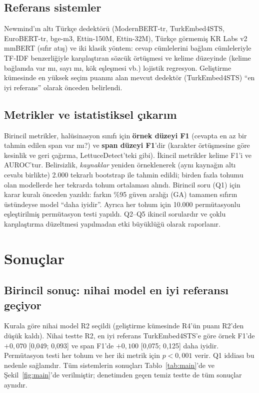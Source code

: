\documentclass[conference,a4paper]{IEEEtran}
\begin{document}
\subsection{Referans sistemler}
Newmind'ın altı Türkçe dedektörü (ModernBERT-tr, TurkEmbed4STS, EuroBERT-tr, bge-m3, Ettin-150M, Ettin-32M), Türkçe görmemiş KR Labs v2 mmBERT (sıfır atış) ve iki klasik yöntem: cevap cümlelerini bağlam cümleleriyle TF-IDF benzerliğiyle karşılaştıran sözcük örtüşmesi ve kelime düzeyinde (kelime bağlamda var mı, sayı mı, kök eşleşmesi vb.) lojistik regresyon. Geliştirme kümesinde en yüksek seçim puanını alan mevcut dedektör (TurkEmbed4STS) ``en iyi referans'' olarak önceden belirlendi.

\subsection{Metrikler ve istatistiksel çıkarım}
Birincil metrikler, halüsinasyon sınıfı için \textbf{örnek düzeyi F1} (cevapta en az bir tahmin edilen span var mı?) ve \textbf{span düzeyi F1}'dir (karakter örtüşmesine göre kesinlik ve geri çağırma, LettuceDetect'teki gibi). İkincil metrikler kelime F1'i ve AUROC'tur. Belirsizlik, \emph{kaynaklar} yeniden örneklenerek (aynı kaynağın altı cevabı birlikte) 2.000 tekrarlı bootstrap ile tahmin edildi; birden fazla tohumu olan modellerde her tekrarda tohum ortalaması alındı. Birincil soru (Q1) için karar kuralı önceden yazıldı: farkın \%95 güven aralığı (GA) tamamen sıfırın üstündeyse model ``daha iyidir''. Ayrıca her tohum için 10.000 permütasyonlu eşleştirilmiş permütasyon testi yapıldı. Q2--Q5 ikincil sorulardır ve çoklu karşılaştırma düzeltmesi yapılmadan etki büyüklüğü olarak raporlanır.

\section{Sonuçlar}

\subsection{Birincil sonuç: nihai model en iyi referansı geçiyor}
Kurala göre nihai model R2 seçildi (geliştirme kümesinde R4'ün puanı R2'den düşük kaldı). Nihai testte R2, en iyi referans TurkEmbed4STS'e göre örnek F1'de $+0{,}070$ [0{,}049; 0{,}093] ve span F1'de $+0{,}100$ [0{,}075; 0{,}125] daha iyidir. Permütasyon testi her tohum ve her iki metrik için $p<0{,}001$ verir. Q1 iddiası bu nedenle sağlamdır. Tüm sistemlerin sonuçları Tablo~\ref{tab:main}'de ve Şekil~\ref{fig:main}'de verilmiştir; denetimden geçen temiz testte de tüm sonuçlar aynıdır.
\end{document}
